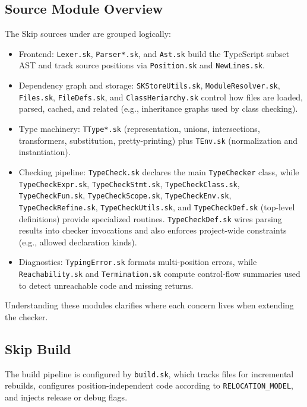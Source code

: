 \documentclass[11pt]{article}
\newcommand{\code}[1]{\path{#1}}
\begin{document}
\subsection{Source Module Overview}
The Skip sources under \code{src/} are grouped logically:
\begin{itemize}[leftmargin=*]
  \item Frontend: \texttt{Lexer.sk}, \texttt{Parser*.sk}, and \texttt{Ast.sk} build the TypeScript subset AST and track source positions via \texttt{Position.sk} and \texttt{NewLines.sk}.
  \item Dependency graph and storage: \texttt{SKStoreUtils.sk}, \texttt{ModuleResolver.sk}, \texttt{Files.sk}, \texttt{FileDefs.sk}, and \texttt{ClassHeriarchy.sk} control how files are loaded, parsed, cached, and related (e.g., inheritance graphs used by class checking).
  \item Type machinery: \texttt{TType*.sk} (representation, unions, intersections, transformers, substitution, pretty-printing) plus \texttt{TEnv.sk} (normalization and instantiation).
  \item Checking pipeline: \texttt{TypeCheck.sk} declares the main \texttt{TypeChecker} class, while \texttt{TypeCheckExpr.sk}, \texttt{TypeCheckStmt.sk}, \texttt{TypeCheckClass.sk}, \texttt{TypeCheckFun.sk}, \texttt{TypeCheckScope.sk}, \texttt{TypeCheckEnv.sk}, \texttt{TypeCheckRefine.sk}, \texttt{TypeCheckUtils.sk}, and \texttt{TypeCheckDef.sk} (top-level definitions) provide specialized routines. \texttt{TypeCheckDef.sk} wires parsing results into checker invocations and also enforces project-wide constraints (e.g., allowed declaration kinds).
  \item Diagnostics: \texttt{TypingError.sk} formats multi-position errors, while \texttt{Reachability.sk} and \texttt{Termination.sk} compute control-flow summaries used to detect unreachable code and missing returns.
\end{itemize}
Understanding these modules clarifies where each concern lives when extending the checker.

\subsection{Skip Build}
The build pipeline is configured by \texttt{build.sk}, which tracks files for incremental rebuilds, configures position-independent code according to \texttt{RELOCATION\_MODEL}, and injects release or debug flags.
\end{document}
